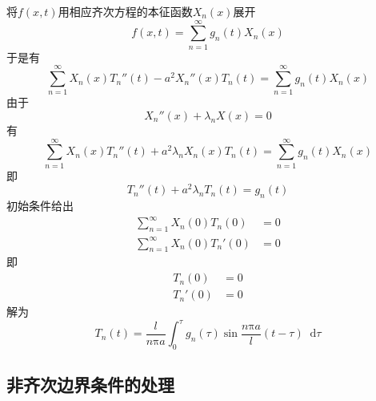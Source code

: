 \documentclass{article}
\newcommand*{\md}{\mathop{}\!\mathrm{d}}
\begin{document}
将$f(x,t)$用相应齐次方程的本征函数$X_{n}(x)$展开
\begin{equation*}
  f(x,t) = \sum\limits_{n=1}^{\infty} g_{n}(t) X_{n}(x)
\end{equation*}
于是有
\begin{equation*}
  \sum\limits_{n=1}^{\infty} X_{n}(x)T_{n}''(t) - a^{2} X_{n}''(x)T_{n}(t) = \sum\limits_{n=1}^{\infty} g_{n}(t) X_{n}(x)
\end{equation*}
由于
\begin{equation*}
  X_{n}''(x) + \lambda_{n} X(x) = 0
\end{equation*}
有
\begin{equation*}
  \sum\limits_{n=1}^{\infty} X_{n}(x)T_{n}''(t) + a^{2} \lambda_{n} X_{n}(x)T_{n}(t) = \sum\limits_{n=1}^{\infty} g_{n}(t) X_{n}(x)
\end{equation*}
即
\begin{equation*}
  T_{n}''(t) + a^{2} \lambda_{n}T_{n}(t) = g_{n}(t)
\end{equation*}
初始条件给出
\begin{equation*}
  \begin{aligned}
    \sum\limits_{n=1}^{\infty} X_{n}(0)T_{n}(0) &= 0\\
    \sum\limits_{n=1}^{\infty} X_{n}(0)T_{n}'(0) &= 0
  \end{aligned}
\end{equation*}
即
\begin{equation*}
  \begin{aligned}
    T_{n}(0) &= 0\\
    T_{n}'(0) &= 0
  \end{aligned}
\end{equation*}
解为
\begin{equation*}
  T_{n}(t) = \dfrac{l}{n \mathrm{\pi} a} \int_{0}^{\tau} g_{n} (\tau) \sin \dfrac{n \mathrm{\pi} a}{l} (t - \tau ) \md \tau 
\end{equation*}

\subsection{非齐次边界条件的处理}
\end{document}
